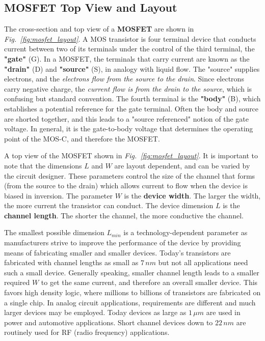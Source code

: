 \subsection{MOSFET Top View and Layout}
The cross-section and top view of a \textbf{MOSFET} are shown in \emph{Fig.~\ref{fig:mosfet_layout}}.  A MOS transistor is four terminal device that conducts current between two of its terminals under the control of the third terminal, the \textbf{"gate"} (G).  In a MOSFET, the terminals that carry current are known as the \textbf{"drain"} (D) and \textbf{"source"} (S), in analogy with liquid flow.  The "source" supplies electrons, and the \textit{electrons flow from the source to the drain}.  Since electrons carry negative charge, the \textit{current flow is from the drain to the source}, which is confusing but standard convention.  The fourth terminal is the \textbf{"body"} (B), which establishes a potential reference for the gate terminal.  Often the body and source are shorted together, and this leads to a "source referenced" notion of the gate voltage.  In general, it is the gate-to-body voltage that determines the operating point of the MOS-C, and therefore the MOSFET.

A top view of the MOSFET shown in \emph{Fig.~\ref{fig:mosfet_layout}}.  It is important to note that the dimensions $L$ and $W$ are layout dependent, and can be varied by the circuit designer.  These parameters control the size of the channel that forms (from the source to the drain) which allows current to flow when the device is biased in inversion.  The parameter $W$ is the \textbf{device width}.  The larger the width, the more current the transistor can conduct.  The device dimension $L$ is the \textbf{channel length}. The shorter the channel, the more conductive the channel.

The smallest possible dimension $L_{min}$ is a technology-dependent parameter as manufacturers strive to improve the performance of the device by providing means of fabricating smaller and smaller devices.  Today's transistors are fabricated with channel lengths as small as $7\,nm$ but not all applications need such a small device.  Generally speaking, smaller channel length leads to a smaller required $W$ to get the same current, and therefore an overall smaller device.  This favors high density logic, where millions to billions of transistors are fabricated on a single chip.  In analog circuit applications, requirements are different and much larger devices may be employed.  Today devices as large as $1\,\mu m$ are used in power and automotive applications.  Short channel devices down to $22\,nm$ are routinely used for RF (radio frequency) applications.

